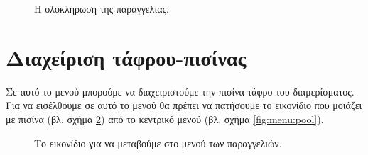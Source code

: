 \documentclass[a4paper,titlepage,twoside,12pt,leqno]{article}
\begin{document}
\begin{figure}
\begin{center}
\caption{Η ολοκλήρωση της παραγγελίας.}
\label{fig:menu:order-payment}
\end{center}
\end{figure}

\newpage

\section{Διαχείριση τάφρου-πισίνας}
\label{pisina}

Σε αυτό το μενού μπορούμε να διαχειριστούμε την πισίνα-τάφρο του διαμερίσματος. Για να εισέλθουμε σε αυτό το μενού θα πρέπει να πατήσουμε το εικονίδιο που μοιάζει με πισίνα (βλ. σχήμα \ref{fig:icon:pool}) από το κεντρικό μενού (βλ. σχήμα \ref{fig:menu:pool}).

\begin{figure}
\begin{center}
\caption{Το εικονίδιο για να μεταβούμε στο μενού των παραγγελιών.}
\label{fig:icon:pool}
\end{center}
\end{figure}
\end{document}
